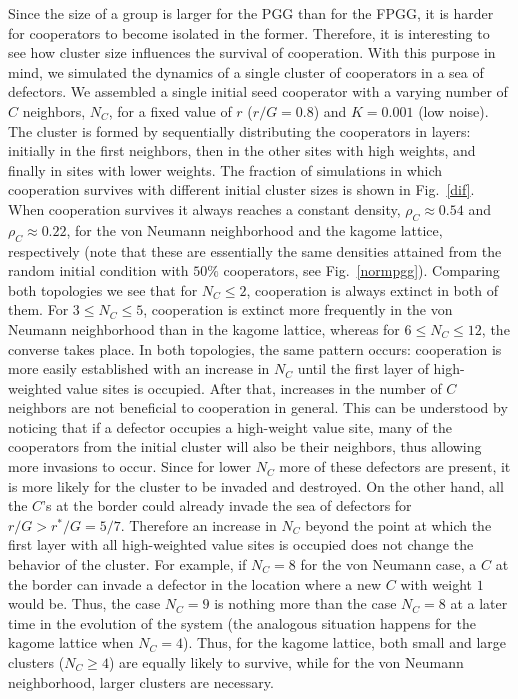 \documentclass[5p,review]{elsarticle}
\begin{document}
Since the size of a group is larger for the PGG than for the FPGG, it is harder for cooperators to become isolated in the former. Therefore, it is interesting to see how cluster size influences the survival of cooperation.
%
With this purpose in mind, we simulated the dynamics of a single cluster of cooperators in a sea of defectors. We assembled a single initial seed cooperator with a varying number of $C$ neighbors, $N_C$, for a fixed value of $r$ ($r/G = 0.8$) and $K = 0.001$ (low noise). The cluster is formed by sequentially distributing the cooperators in layers: initially in the first neighbors, then in the other sites with high weights, and finally in sites with lower weights. The fraction of simulations in which cooperation survives with different initial cluster sizes is shown in Fig.~\ref{dif}.
%
When cooperation survives it always reaches a constant density,  $\rho_C\approx 0.54$ and $\rho_C\approx 0.22$, for the von Neumann neighborhood and the kagome lattice, respectively (note that these are essentially the same densities attained from the random initial condition with $50\%$ cooperators, see Fig.~\ref{normpgg}).
%
Comparing both topologies we see that for $N_C\leqslant 2$, cooperation is always extinct in both of them. 
%
For $ 3 \leqslant N_C \leqslant 5$, cooperation is extinct more frequently in the von Neumann neighborhood than in the kagome lattice, whereas for $ 6 \leqslant N_C \leqslant 12$, the converse takes place. 
%
In both topologies, the same pattern occurs: cooperation is more easily established with an increase in $N_C$ until the first layer of high-weighted value sites is occupied. After that, increases in the number of  $C$ neighbors are not beneficial to cooperation in general.
%
This can be understood by noticing that if a defector occupies a high-weight value site, many of the cooperators from the initial cluster will also be their neighbors, thus allowing more invasions to occur. Since for lower $N_C$ more of these defectors are present, it is more likely for the cluster to be invaded and destroyed.
% 
On the other hand,  all the $C$'s at the border could already invade the sea of defectors for $r/G > r^*/G =  5/7$. Therefore an increase in $N_C$ beyond the point at which the first layer with all high-weighted value sites is occupied does not change the behavior of the cluster.
%
For example, if $N_C=8$ for the von Neumann case, a $C$ at the border can invade a defector in the location where a new $C$ with weight $1$ would be. Thus, the case $N_C=9$ is nothing more than the case $N_C=8$ at a later time in the evolution of the system (the analogous situation happens for the kagome lattice when $N_C=4$).
%
Thus, for the kagome lattice, both small and large clusters ($N_C\geqslant 4$) are equally likely to survive, while for the von Neumann neighborhood, larger clusters are necessary.
\end{document}
